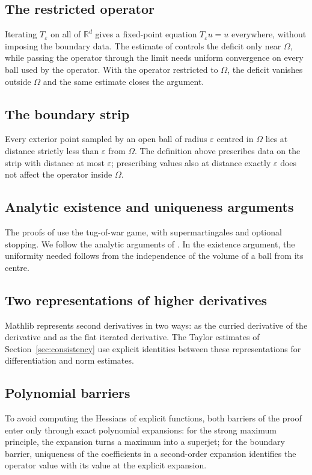 \documentclass[11pt,reqno]{amsart}
\newcommand{\R}{\mathbb{R}}
\newcommand{\eps}{\varepsilon}
\newcommand{\Op}{T_{\eps}}                       %
\theoremstyle{plain}
\theoremstyle{definition}
\theoremstyle{remark}
\begin{document}
\subsection{The restricted operator}
Iterating $\Op$ on all of $\R^d$ gives a fixed-point equation $\Op u=u$
everywhere, without imposing the boundary data. The estimate of
\cite{LPS14} controls the deficit only near
$\Omega$, while passing the operator through the limit needs uniform
convergence on every ball used by the operator. With the operator restricted
to $\Omega$, the deficit vanishes
outside $\Omega$ and the same estimate closes the argument.

\subsection{The boundary strip}
Every exterior point sampled by an open ball of radius $\eps$ centred in
$\Omega$ lies at distance strictly less than $\eps$ from $\Omega$. The definition above
prescribes data on the strip with distance at most $\eps$; prescribing
values also at distance exactly $\eps$ does not affect the operator
inside $\Omega$.

\subsection{Analytic existence and uniqueness arguments}
The proofs of \cite{MPR12} use the tug-of-war game, with supermartingales and
optional stopping. We follow the analytic arguments of \cite{LPS14}. In the
existence argument, the uniformity needed follows from the independence of the
volume of a ball from its centre.

\subsection{Two representations of higher derivatives}
Mathlib represents second derivatives in two ways: as the curried derivative
of the derivative and as the flat iterated derivative. The Taylor estimates
of Section~\ref{sec:consistency} use explicit identities between these
representations for differentiation and norm estimates.

\subsection{Polynomial barriers}
To avoid computing the Hessians of explicit functions, both barriers of the
proof enter only through exact polynomial expansions: for the strong maximum
principle, the expansion turns a maximum into a superjet; for the boundary
barrier, uniqueness of the coefficients in a second-order expansion identifies the operator value with
its value at the explicit expansion.
\end{document}

